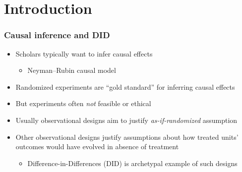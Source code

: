 \documentclass[table, xcolor = {dvipsnames}, 9pt]{beamer}
\theoremstyle{plain}
\begin{document}
\section{Introduction}
\begin{frame}[t]
\frametitle{Causal inference and DID}
\vfill
\begin{itemize}
\item Scholars typically want to infer causal effects \vfill
\begin{itemize}
\item \pause Neyman--Rubin causal model \citep{neyman1923,rubin1974}  \vfill
\end{itemize} 
\item \pause Randomized experiments are ``gold standard'' for inferring causal effects \vfill
\item \pause But experiments often \textit{not} feasible or ethical \vfill
\item \pause Usually observational designs aim to justify \textit{as-if-randomized} assumption \vfill
\item \pause Other observational designs justify assumptions about how treated units' outcomes would have evolved in absence of treatment \vfill
\begin{itemize}
\item \pause Difference-in-Differences (DID) is archetypal example of such designs \vfill
\end{itemize} 
\end{itemize}
\vfill
\end{frame}
\end{document}
